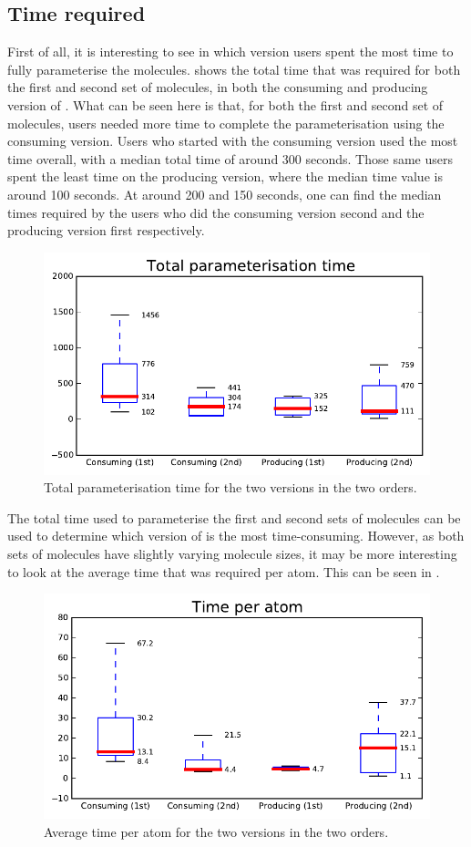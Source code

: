 \subsection{Time required}
First of all, it is interesting to see in which version users spent the most time to fully parameterise the molecules.  shows the total time that was required for both the first and second set of molecules, in both the consuming and producing version of \oframp. What can be seen here is that, for both the first and second set of molecules, users needed more time to complete the parameterisation using the consuming version. Users who started with the consuming version used the most time overall, with a median total time of around 300 seconds. Those same users spent the least time on the producing version, where the median time value is around 100 seconds. At around 200 and 150 seconds, one can find the median times required by the users who did the consuming version second and the producing version first respectively.

\begin{figure}
\center
\includegraphics[width=.6\textwidth]{img/graphs/1a_02.pdf}
\caption{Total parameterisation time for the two versions in the two orders.}
\end{figure}

The total time used to parameterise the first and second sets of molecules can be used to determine which version of \oframp{} is the most time-consuming. However, as both sets of molecules have slightly varying molecule sizes, it may be more interesting to look at the average time that was required per atom. This can be seen in .

\begin{figure}
\center
\includegraphics[width=.6\textwidth]{img/graphs/1a_03.pdf}
\caption{Average time per atom for the two versions in the two orders.}
\end{figure}

